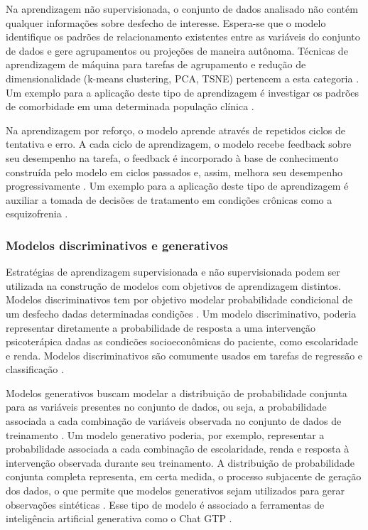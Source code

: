 Na aprendizagem não supervisionada, o conjunto de dados analisado não contém qualquer informações sobre desfecho de interesse. Espera-se que o modelo
identifique os padrões de relacionamento existentes entre as variáveis do conjunto de dados e gere agrupamentos ou projeções de maneira autônoma.
Técnicas de aprendizagem de máquina para tarefas de agrupamento e redução de dimensionalidade (k-means clustering, PCA, TSNE) pertencem a esta categoria
\cite{Theobald2021, Bi2019}. Um exemplo para a aplicação deste tipo de aprendizagem é investigar os padrões de comorbidade em uma determinada população
clínica \cite{Sanchez2019}.

Na aprendizagem por reforço, o modelo aprende através de repetidos ciclos de tentativa e erro. A cada ciclo de aprendizagem, o modelo recebe feedback sobre seu
desempenho na tarefa, o feedback é incorporado à base de conhecimento construída pelo modelo em ciclos passados e, assim, melhora seu desempenho progressivamente
\cite{Theobald2021, Bi2019}. Um exemplo para a aplicação deste tipo de aprendizagem é auxiliar a tomada de decisões de tratamento em condições crônicas como a
esquizofrenia \cite{Shortreed2010}.

\subsubsection{Modelos discriminativos e generativos}

Estratégias de aprendizagem supervisionada e não supervisionada podem ser utilizada na construção de modelos com objetivos de aprendizagem distintos. Modelos
discriminativos tem por objetivo modelar probabilidade condicional de um desfecho dadas determinadas condições \cite{Bi2019, Ng2001}. Um modelo discriminativo,
poderia representar diretamente a probabilidade de resposta a uma intervenção psicoterápica dadas as condicões socioeconômicas do paciente, como escolaridade e
renda. Modelos discriminativos são comumente usados em tarefas de regressão e classificação \cite{Bi2019}.

Modelos generativos buscam modelar a distribuição de probabilidade conjunta para as variáveis presentes no conjunto de dados, ou seja, a probabilidade associada
a cada combinação de variáveis observada no conjunto de dados de treinamento \cite{Bi2019, Ng2001}. Um modelo generativo poderia, por exemplo, representar a
probabilidade associada a cada combinação de escolaridade, renda e resposta à intervenção observada durante seu treinamento. A distribuição de probabilidade
conjunta completa representa, em certa medida, o processo subjacente de geração dos dados, o que permite que modelos generativos sejam utilizados para gerar
observações sintéticas \cite{Bi2019}. Esse tipo de modelo é associado a ferramentas de inteligência artificial generativa como o Chat GTP \cite{Wu2023}.

